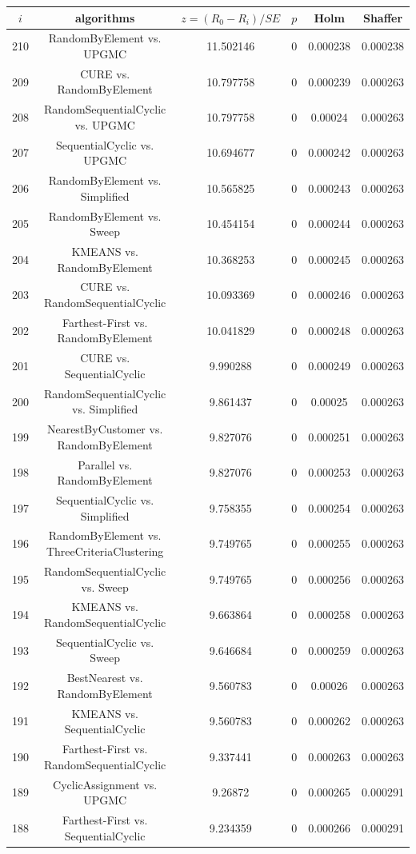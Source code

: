 \documentclass[a4paper,10pt]{article}
\begin{document}
\begin{landscape}
\begin{table}[!htp]
\centering\scriptsize
\begin{tabular}{cccccc}
$i$&algorithms&$z=(R_0 - R_i)/SE$&$p$&Holm&Shaffer\\
\hline210&RandomByElement vs. UPGMC&11.502146&0&0.000238&0.000238\\
209&CURE vs. RandomByElement&10.797758&0&0.000239&0.000263\\
208&RandomSequentialCyclic vs. UPGMC&10.797758&0&0.00024&0.000263\\
207&SequentialCyclic vs. UPGMC&10.694677&0&0.000242&0.000263\\
206&RandomByElement vs. Simplified&10.565825&0&0.000243&0.000263\\
205&RandomByElement vs. Sweep&10.454154&0&0.000244&0.000263\\
204&KMEANS vs. RandomByElement&10.368253&0&0.000245&0.000263\\
203&CURE vs. RandomSequentialCyclic&10.093369&0&0.000246&0.000263\\
202&Farthest-First vs. RandomByElement&10.041829&0&0.000248&0.000263\\
201&CURE vs. SequentialCyclic&9.990288&0&0.000249&0.000263\\
200&RandomSequentialCyclic vs. Simplified&9.861437&0&0.00025&0.000263\\
199&NearestByCustomer vs. RandomByElement&9.827076&0&0.000251&0.000263\\
198&Parallel vs. RandomByElement&9.827076&0&0.000253&0.000263\\
197&SequentialCyclic vs. Simplified&9.758355&0&0.000254&0.000263\\
196&RandomByElement vs. ThreeCriteriaClustering&9.749765&0&0.000255&0.000263\\
195&RandomSequentialCyclic vs. Sweep&9.749765&0&0.000256&0.000263\\
194&KMEANS vs. RandomSequentialCyclic&9.663864&0&0.000258&0.000263\\
193&SequentialCyclic vs. Sweep&9.646684&0&0.000259&0.000263\\
192&BestNearest vs. RandomByElement&9.560783&0&0.00026&0.000263\\
191&KMEANS vs. SequentialCyclic&9.560783&0&0.000262&0.000263\\
190&Farthest-First vs. RandomSequentialCyclic&9.337441&0&0.000263&0.000263\\
189&CyclicAssignment vs. UPGMC&9.26872&0&0.000265&0.000291\\
188&Farthest-First vs. SequentialCyclic&9.234359&0&0.000266&0.000291\\

\end{tabular}
\end{table}
\end{landscape}
\end{document}
